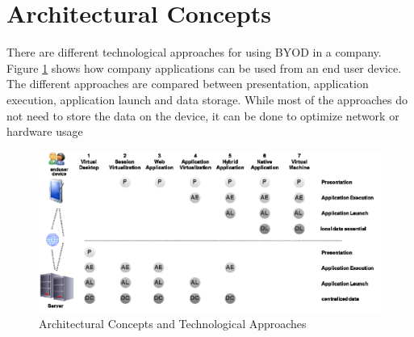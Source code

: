 \section{Architectural Concepts}
There are different technological approaches for using BYOD in a company. Figure \ref{fig:architectural_concepts} shows how company applications can be used from an end user device. The different approaches are compared between presentation, application execution, application launch and data storage. While most of the approaches do not need to store the data on the device, it can be done to optimize network or hardware usage \parencite{Disterer.2013}
\begin{figure}[H]
	\includegraphics[width=1\linewidth]{images/architectural_concepts}
	\caption{Architectural Concepts and Technological Approaches \parencite{Disterer.2013}}
	\label{fig:architectural_concepts}
\end{figure}

